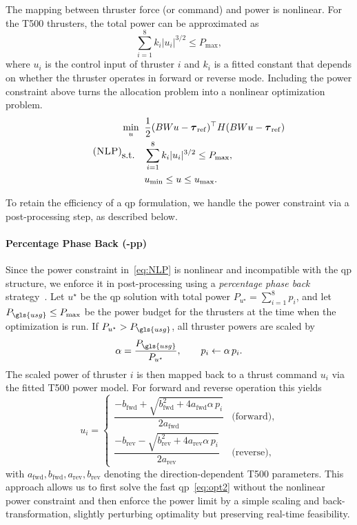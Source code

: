 The mapping between thruster force (or command) and power is nonlinear. For the T500 thrusters, the total power can be approximated as
\[
\sum_{i=1}^8 k_i |u_i|^{3/2} \leq P_{\max},
\]
where \(u_i\) is the control input of thruster \(i\) and \(k_i\) is a fitted constant that depends on whether the thruster operates in forward or reverse mode. Including the power constraint above turns the allocation problem into a nonlinear optimization problem. 
\begin{equation}
\label{eq:NLP}
\tag{\textsc{NLP}}
\begin{aligned}
\min_{u}\;\; &\frac{1}{2} (BWu - \vec{\tau}_{\mathrm{ref}})^\top H (BWu - \vec{\tau}_{\mathrm{ref}}) \\
\text{s.t.}\quad & \sum_{i=1}^8 k_i |u_i|^{3/2} \leq P_{\max}, \\
& u_{\min} \leq u \leq u_{\max}.
\end{aligned}
\end{equation}

To retain the efficiency of a \gls{qp} formulation, we handle the power constraint via a post-processing step, as described below.
\paragraph{Percentage Phase Back (-pp)}
\label{sec:percentage_phase_back}

Since the power constraint in~\eqref{eq:NLP} is nonlinear and incompatible with the \gls{qp} structure, we enforce it in post-processing using a \emph{percentage phase back} strategy~\cite{jenssen2006power}. Let \(u^\star\) be the \gls{qp} solution with total power \(P_{u^\star} = \sum_{i=1}^8 p_i\), and let \(P_{\gls{usg}} \leq P_{\max}\) be the power budget for the thrusters at the time when the optimization is run. If \(P_{u^\star} > P_{\gls{usg}}\), all thruster powers are scaled by
\[
\alpha = \frac{P_{\gls{usg}}}{P_{u^\star}},
\qquad
p_i \leftarrow \alpha\, p_i.
\]
The scaled power of thruster \(i\) is then mapped back to a thrust command \(u_i\) via the fitted T500 power model. For forward and reverse operation this yields
\begin{equation}
u_{i} = \begin{cases}
     \dfrac{-b_{\mathrm{fwd}} + \sqrt{b_{\mathrm{fwd}}^{2} + 4 a_{\mathrm{fwd}} \alpha\, p_{i}}}{2 a_{\mathrm{fwd}}} 
     & \text{(forward)},\\[8pt]
     \dfrac{-b_{\mathrm{rev}} - \sqrt{b_{\mathrm{rev}}^{2} + 4 a_{\mathrm{rev}} \alpha\, p_{i}}}{2 a_{\mathrm{rev}}} 
     & \text{(reverse)},
\end{cases}
\label{eq:percentage_phase_back}
\end{equation}
with \(a_{\mathrm{fwd}}, b_{\mathrm{fwd}}, a_{\mathrm{rev}}, b_{\mathrm{rev}}\) denoting the direction-dependent T500 parameters. This approach allows us to first solve the fast \gls{qp}~\eqref{eq:opt2} without the nonlinear power constraint and then enforce the power limit by a simple scaling and back-transformation, slightly perturbing optimality but preserving real-time feasibility.


